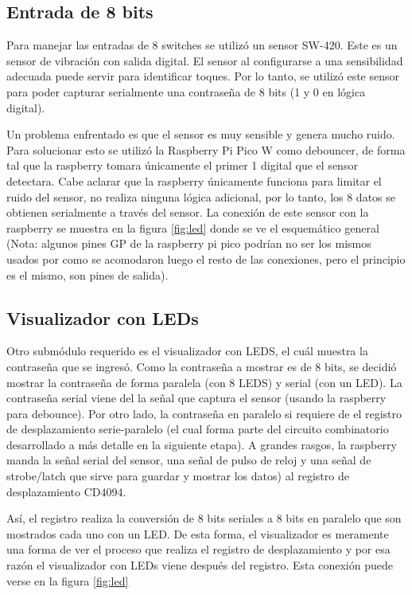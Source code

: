 \documentclass[12pt,a4paper]{article}
\begin{document}
\subsection{Entrada de 8 bits}

Para manejar las entradas de 8 switches se utilizó un sensor SW-420. Este es un sensor de vibración con salida digital. El sensor al configurarse a una sensibilidad adecuada puede servir para identificar toques. Por lo tanto, se utilizó este sensor para poder capturar serialmente una contraseña de 8 bits (1 y 0 en lógica digital).

Un problema enfrentado es que el sensor es muy sensible y genera mucho ruido. Para solucionar esto se utilizó la Raspberry Pi Pico W como debouncer, de forma tal que la raspberry tomara únicamente el primer 1 digital que el sensor detectara. Cabe aclarar que la raspberry únicamente funciona para limitar el ruido del sensor, no realiza ninguna lógica adicional, por lo tanto, los 8 datos se obtienen serialmente a través del sensor. La conexión de este sensor con la raspberry se muestra en la figura \ref{fig:led} donde se ve el esquemático general (Nota: algunos pines GP de la raspberry pi pico podrían no ser los mismos usados por como se acomodaron luego el resto de las conexiones, pero el principio es el mismo, son pines de salida).

\subsection{Visualizador con LEDs}

Otro submódulo requerido es el visualizador con LEDS, el cuál muestra la contraseña que se ingresó. Como la contraseña a mostrar es de 8 bits, se decidió mostrar la contraseña de forma paralela (con 8 LEDS) y serial (con un LED). La contraseña serial viene del la señal que captura el sensor (usando la raspberry para debounce). Por otro lado, la contraseña en paralelo si requiere de el registro de desplazamiento serie-paralelo (el cual forma parte del circuito combinatorio desarrollado a más detalle en la siguiente etapa). A grandes rasgos, la raspberry manda la señal serial del sensor, una señal de pulso de reloj y una señal de strobe/latch que sirve para guardar y mostrar los datos) al registro de desplazamiento CD4094. 

Así, el registro realiza la conversión de 8 bits seriales a 8 bits en paralelo que son mostrados cada uno con un LED. De esta forma, el visualizador es meramente una forma de ver el proceso que realiza el registro de desplazamiento y por esa razón el visualizador con LEDs viene después del registro. Esta conexión puede verse en la figura \ref{fig:led}
\end{document}

